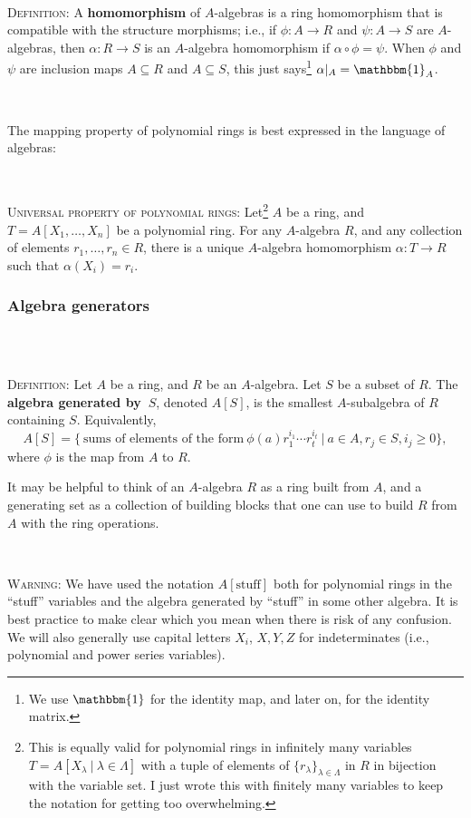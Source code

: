 \documentclass[12pt]{amsart}
\newcommand{\0}{$\phantom{.}$}
\newcommand{\1}{\mathbbm{1}}
\newcommand{\sssec}[1]{\subsubsection*{#1}}
\begin{document}
\



\noindent \textsc{Definition:} A \textbf{homomorphism} of $A$-algebras is a ring homomorphism that is compatible with the structure morphisms; i.e., if $\phi:A\to R$ and $\psi:A\to S$ are $A$-algebras, then $\alpha:R\to S$ is an $A$-algebra homomorphism if $\alpha\circ \phi = \psi$. When $\phi$ and $\psi$ are inclusion maps $A\subseteq R$ and $A\subseteq S$, this just says\footnote{We use $\1$ for the identity map, and later on, for the identity matrix.} $\alpha|_A = \1_A$.

\

\noindent The mapping property of polynomial rings is best expressed in the language of algebras:

\

\noindent \textsc{Universal property of polynomial rings:} Let\footnote{This is equally valid for polynomial rings in infinitely many variables $T=A[X_{\lambda} \ | \ \lambda\in \Lambda]$ with a tuple of elements of  $\{r_\lambda\}_{\lambda\in \Lambda}$ in $R$ in bijection with the variable set. I just wrote this with finitely many variables to keep the notation for getting too overwhelming.} $A$ be a ring, and $T=A[X_1,\dots,X_n]$ be a polynomial ring. For any $A$-algebra $R$, and any collection of elements $r_1,\dots,r_n\in R$, there is a unique $A$-algebra homomorphism $\alpha: T\to R$ such that $\alpha(X_i) = r_i$.



\sssec{Algebra generators} \0

\


\noindent \textsc{Definition:} Let $A$ be a ring, and $R$ be an $A$-algebra. Let $S$ be a subset of $R$. The \textbf{algebra generated by~$S$}, denoted $A[S]$, is the smallest $A$-subalgebra of $R$ containing $S$. Equivalently,
\[ A[S] = \{ \ \text{sums of elements of the form} \ \phi(a) r_1^{i_1} \cdots r_t^{i_t} \ | \ a\in A, r_j\in S, i_j\geq 0\},\]
where $\phi$ is the map from $A$ to $R$.


It may be helpful to think of an $A$-algebra $R$ as a ring built from $A$, and a generating set as a collection of building blocks that one can use to build $R$ from $A$ with the ring operations.

\

\noindent \textsc{Warning:} We have used the notation $A[ \text{stuff} ]$ both for polynomial rings in the ``stuff'' variables and the algebra generated by ``stuff'' in some other algebra. It is best practice to make clear which you mean when there is risk of any confusion. We will also generally use capital letters $X_i$, $X,Y,Z$ for indeterminates (i.e., polynomial and power series variables).
\end{document}
